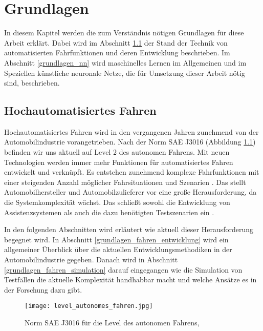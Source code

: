 
\chapter{Grundlagen}
\label{grundlagen}

In diesem Kapitel werden die zum Verständnis nötigen Grundlagen für diese Arbeit erklärt. Dabei wird im Abschnitt \ref{grundlagen_fahren} der Stand der Technik von automatisierten Fahrfunktionen und deren Entwicklung beschrieben. Im Abschnitt \ref{grundlagen_nn} wird maschinelles Lernen im Allgemeinen und im Speziellen künstliche neuronale Netze, die für Umsetzung dieser Arbeit nötig sind, beschrieben.


\section{Hochautomatisiertes Fahren}
\label{grundlagen_fahren}

Hochautomatisiertes Fahren wird in den vergangenen Jahren zunehmend von der Automobilindustrie vorangetrieben. Nach der Norm SAE J3016 (Abbildung \ref{fig_level_autonomes_fahren}) befinden wir uns aktuell auf Level 2 des autonomen Fahrens. Mit neuen Technologien werden immer mehr Funktionen für automatisiertes Fahren entwickelt und verknüpft. Es entstehen zunehmend komplexe Fahrfunktionen mit einer steigenden Anzahl möglicher Fahrsituationen und Szenarien \cite{king2017}. Das stellt Automobilhersteller und Automobilzulieferer vor eine große Herausforderung, da die Systemkomplexität wächst. Das schließt sowohl die Entwicklung von Assistenzsystemen als auch die dazu benötigten Testszenarien ein \cite{pfeffer2016}.

In den folgenden Abschnitten wird erläutert wie aktuell dieser Herausforderung begegnet wird. In Abschnitt \ref{grundlagen_fahren_entwicklung} wird ein allgemeiner Überblick über die aktuellen Entwicklungsmethodiken in der Automobilindustrie gegeben. Danach wird in Abschnitt \ref{grundlagen_fahren_simulation} darauf eingegangen wie die Simulation von Testfällen die aktuelle Komplexität handhabbar macht und welche Ansätze es in der Forschung dazu gibt.

\begin{figure}[h]
\centering
\texttt{[image: level\_autonomes\_fahren.jpg]}
\caption{Norm SAE J3016 für die Level des autonomen Fahrens, \cite{sae2014taxonomy}}
\label{fig_level_autonomes_fahren}
\end{figure}


